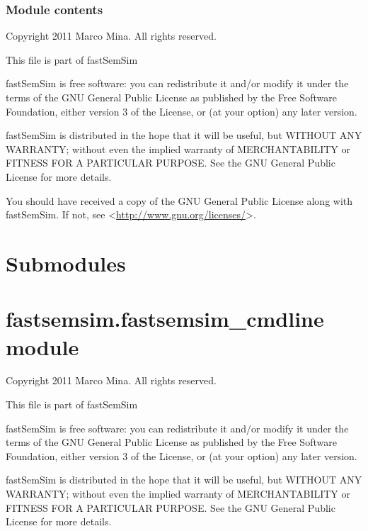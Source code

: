 \documentclass[letterpaper,10pt,english]{sphinxmanual}
\begin{document}
\subsubsection{Module contents}
\label{fastsemsim.examples:module-contents}\label{fastsemsim.examples:module-fastsemsim.examples}
Copyright 2011 Marco Mina. All rights reserved.

This file is part of fastSemSim

fastSemSim is free software: you can redistribute it and/or modify
it under the terms of the GNU General Public License as published by
the Free Software Foundation, either version 3 of the License, or
(at your option) any later version.

fastSemSim is distributed in the hope that it will be useful,
but WITHOUT ANY WARRANTY; without even the implied warranty of
MERCHANTABILITY or FITNESS FOR A PARTICULAR PURPOSE.  See the
GNU General Public License for more details.

You should have received a copy of the GNU General Public License
along with fastSemSim.  If not, see \textless{}\href{http://www.gnu.org/licenses/}{http://www.gnu.org/licenses/}\textgreater{}.


\section{Submodules}
\label{fastsemsim:submodules}

\section{fastsemsim.fastsemsim\_cmdline module}
\label{fastsemsim:fastsemsim-fastsemsim-cmdline-module}\label{fastsemsim:module-fastsemsim.fastsemsim_cmdline}
Copyright 2011 Marco Mina. All rights reserved.

This file is part of fastSemSim

fastSemSim is free software: you can redistribute it and/or modify
it under the terms of the GNU General Public License as published by
the Free Software Foundation, either version 3 of the License, or
(at your option) any later version.

fastSemSim is distributed in the hope that it will be useful,
but WITHOUT ANY WARRANTY; without even the implied warranty of
MERCHANTABILITY or FITNESS FOR A PARTICULAR PURPOSE.  See the
GNU General Public License for more details.
\end{document}
